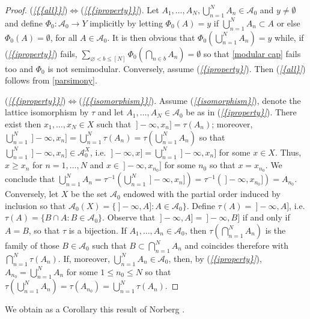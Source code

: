 \documentclass[11pt]{amsart}
\theoremstyle{plain}
\begin{document}
\begin{proof}
{{(\textit{\ref{{{all}}}})}$\Leftrightarrow${(\textit{\ref{{{iproperty}}}})}}. 
Let $A_1,\ldots,A_N,\bigcup_{n=1}^NA_n\in{\mathscr{A}}_0$ and $y\ne{\emptyset}$ and define 
$\Phi_0:{\mathscr{A}}_0\to Y$ implicitly by letting $\Phi_0(A)=y$ if 
$\bigcup_{n=1}^NA_n\subset A$ or else $\Phi_0(A)={\emptyset}$, for all $A\in{\mathscr{A}}_0$. 
It is then obvious that $\Phi_0(\bigcup_{n=1}^NA_n)=y$ while, if {(\textit{\ref{{iproperty}}})} fails, 
$\sum_{{\varnothing}< b\le[N]}\Phi_0(\bigcap_{n\in b}A_n)={\emptyset}$ so that \eqref{modular cap} 
fails too and $\Phi_0$ is not semimodular. Conversely, assume {(\textit{\ref{{iproperty}}})}. Then 
{(\textit{\ref{{all}}})} follows from \eqref{parsimony}.

{{(\textit{\ref{{{iproperty}}}})}$\Leftrightarrow${(\textit{\ref{{{isomorphism}}}})}}. 
Assume {(\textit{\ref{{isomorphism}}})}, denote the lattice isomorphism by $\tau$ and let 
$A_1,\ldots,A_N\in{\mathscr{A}}_0$ be as in {(\textit{\ref{{iproperty}}})}. There exist then
$x_1,\ldots,x_N\in X$ such that ${\ ]-\infty,{x_n}]}=\tau(A_n)$; moreover,
$\bigcup_{n=1}^N{\ ]-\infty,{x_n}]}=\bigcup_{n=1}^N\tau(A_n)=\tau(\bigcup_{n=1}^NA_n)$ 
so that $\bigcup_{n=1}^N{\ ]-\infty,{x_n}]}\in{\mathscr{A}}_0^X$, i.e. ${\ ]-\infty,{x}]}=\bigcup_{n=1}^N{\ ]-\infty,{x_n}]}$
for some $x\in X$. Thus, $x\ge x_n$ for $n=1,\ldots,N$ and $x\in{\ ]-\infty,{x_{n_0}}]}$ for some 
$n_0$ so that $x=x_{n_0}$. We conclude that $\bigcup_{n=1}^NA_n=\tau^{-1}(\bigcup_{n=1}^N{\ ]-\infty,{x_n}]})=\tau^{-1}({\ ]-\infty,{x_{n_0}}]})=A_{n_0}$.
Conversely, let $X$ be the set ${\mathscr{A}}_0$ endowed with the partial order induced
by inclusion so that ${\mathscr{A}}_0(X)=\{{\ ]-\infty,A]}:A\in{\mathscr{A}}_0\}$. Define $\tau(A)={\ ]-\infty,A]}$, i.e. 
$\tau(A)=\{B\cap A:B\in{\mathscr{A}}_0\}$. Observe that ${\ ]-\infty,A]}={\ ]-\infty,B]}$ if and only if $A=B$,
so that $\tau$ is a bijection. If $A_1,\ldots,A_n\in{\mathscr{A}}_0$, then 
$\tau(\bigcap_{n=1}^NA_n)$ is the family of those $B\in{\mathscr{A}}_0$ such that 
$B\subset\bigcap_{n=1}^NA_n$ and coincides therefore with 
$\bigcap_{n=1}^N\tau(A_n)$. If, moreover, $\bigcup_{n=1}^NA_n\in{\mathscr{A}}_0$, then, 
by {(\textit{\ref{{iproperty}}})}, $A_{n_0}=\bigcup_{n=1}^NA_n$ for some $1\le n_0\le N$ so that 
$\tau(\bigcup_{n=1}^NA_n)=\tau(A_{n_0})=\bigcup_{n=1}^N\tau(A_n)$.
\end{proof}

We obtain as a Corollary this result of Norberg \cite[pp. 6-9]{norberg}.
\end{document}

